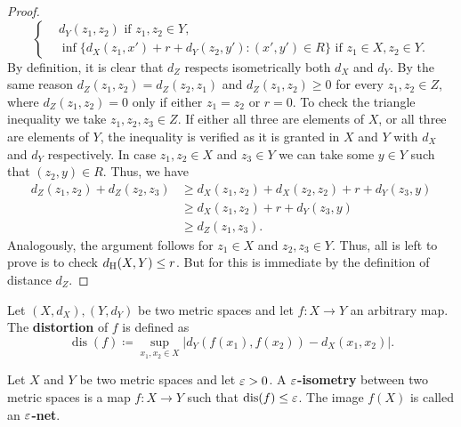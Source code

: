 \begin{proof}
\begin{equation}
\begin{cases}
            &d_Y(z_1, z_2) \text{ if } z_1, z_2 \in Y, \\
            &\inf\{d_X(z_1, x') + r + d_Y(z_2, y') \colon (x', y') \in R\} \text{ if } z_1 \in X, z_2 \in Y.
        \end{cases}
    \end{equation}
    By definition, it is clear that $ d_Z $ respects isometrically both $ d_X $ and $ d_Y $. By the same reason $ d_Z(z_1, z_2) = d_Z(z_2, z_1) $  and $ d_Z(z_1, z_2) \geq 0 $ for every $ z_1, z_2 \in Z$, where $ d_Z(z_1, z_2) = 0 $ only if either $ z_1 = z_2 $ or $ r = 0$. To check the triangle inequality we take $ z_1, z_2, z_3 \in Z $. If either all three are elements of $ X $, or all three are elements of $ Y $, the inequality is verified as it is granted in $ X $ and $ Y $ with $ d_X $ and $ d_Y $ respectively. In case $ z_1, z_2 \in X $ and $ z_3 \in Y $ we can take some $ y \in Y $ such that $ (z_2, y) \in R $. Thus, we have
    \begin{align}
        d_Z(z_1, z_2) + d_Z(z_2, z_3) &\geq d_X(z_1, z_2) + d_X(z_2, z_2) + r + d_Y(z_3, y) \\
        &\geq d_X(z_1, z_2) + r + d_Y(z_3, y) \\
        &\geq d_Z(z_1, z_3).
    \end{align}
    Analogously, the argument follows for $ z_1 \in X $ and $ z_2, z_3 \in Y $. Thus, all is left to prove is to check $ d_{\operatorname{H}}(X, Y) \leq r $. But for this is immediate by the definition of distance $d_Z$.
\end{proof}

\begin{definition}
    Let $ (X, d_X), (Y, d_Y) $ be two metric spaces and let $ f \colon X \to Y $ an arbitrary map. The {\bf distortion} of $ f $ is defined as
    \begin{equation}
        \operatorname{dis}(f) \coloneq \sup_{x_1, x_2 \in X} |d_Y(f(x_1), f(x_2)) - d_X(x_1, x_2)|.
    \end{equation}
\end{definition}

\begin{definition}[$\e$-isometry]
    Let $ X $ and $ Y $ be two metric spaces and let $ \varepsilon > 0 $. A {\bf $\e$-isometry} between two metric spaces is a map $ f \colon X \to Y $ such that $ \operatorname{dis}(f) \leq \varepsilon $. The image $ f(X) $ is called an {\bf $\e$-net}.
\end{definition}

